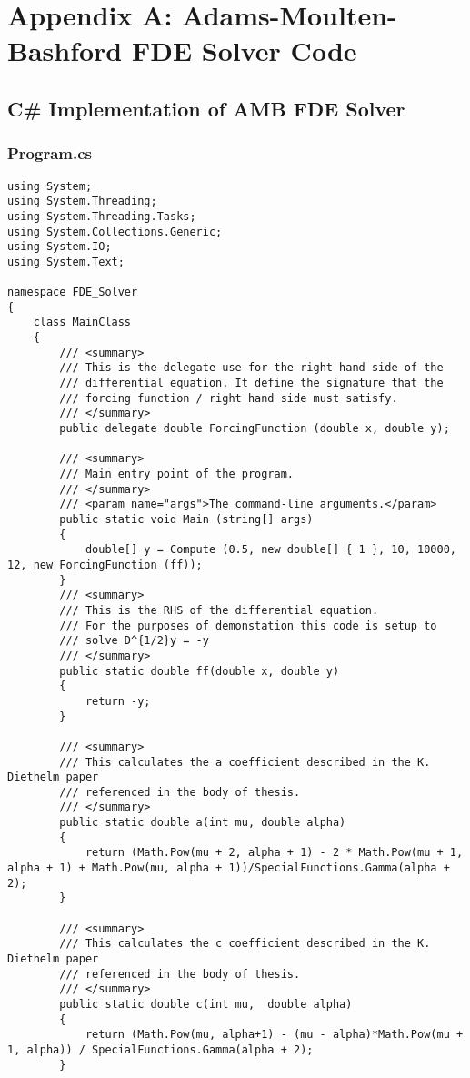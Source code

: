 
\section{Appendix A: Adams-Moulten-Bashford FDE Solver Code}

\subsection{C\# Implementation of AMB FDE Solver}

\subsubsection{Program.cs}
\lstset{language=Java}
\begin{lstlisting}
using System;
using System.Threading;
using System.Threading.Tasks;
using System.Collections.Generic;
using System.IO;
using System.Text;

namespace FDE_Solver
{
	class MainClass
	{
		/// <summary>
		/// This is the delegate use for the right hand side of the
		/// differential equation. It define the signature that the 
		/// forcing function / right hand side must satisfy.
		/// </summary>
		public delegate double ForcingFunction (double x, double y);

		/// <summary>
		/// Main entry point of the program.
		/// </summary>
		/// <param name="args">The command-line arguments.</param>
		public static void Main (string[] args)
		{
		    double[] y = Compute (0.5, new double[] { 1 }, 10, 10000, 12, new ForcingFunction (ff));
		}
		/// <summary>
		/// This is the RHS of the differential equation.
		/// For the purposes of demonstation this code is setup to
		/// solve D^{1/2}y = -y
		/// </summary>
		public static double ff(double x, double y)
		{
			return -y;
		}

		/// <summary>
		/// This calculates the a coefficient described in the K. Diethelm paper
		/// referenced in the body of thesis.
		/// </summary>
		public static double a(int mu, double alpha)
		{
			return (Math.Pow(mu + 2, alpha + 1) - 2 * Math.Pow(mu + 1, alpha + 1) + Math.Pow(mu, alpha + 1))/SpecialFunctions.Gamma(alpha + 2);
		}

		/// <summary>
		/// This calculates the c coefficient described in the K. Diethelm paper
		/// referenced in the body of thesis.
		/// </summary>
		public static double c(int mu,  double alpha)
		{
			return (Math.Pow(mu, alpha+1) - (mu - alpha)*Math.Pow(mu + 1, alpha)) / SpecialFunctions.Gamma(alpha + 2);
		}


\end{lstlisting}

